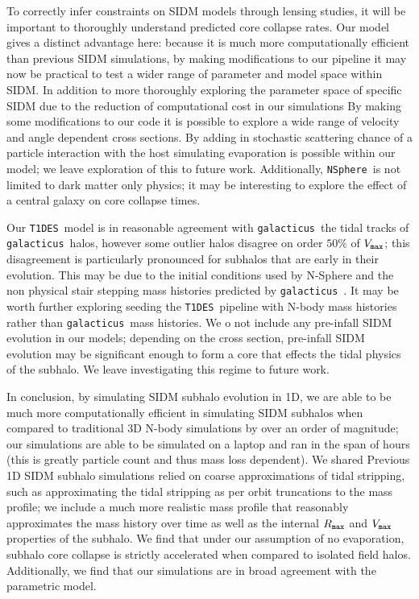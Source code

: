 \documentclass[%
 reprint,
 amsmath,
 amssymb,
 aps,
]{revtex4-2}
\def\gal{{\tt galacticus}~}
\def\tides{{\tt T1DES}~}
\def\nsphere{{\tt NSphere}~}
\begin{document}
To correctly infer constraints on SIDM models through lensing studies, it will be important to thoroughly understand predicted core collapse rates.
Our model gives a distinct advantage here: because it is much more computationally efficient than previous SIDM simulations, by making modifications to our pipeline it may now be practical to test a wider range of parameter and model space within SIDM. 
In addition to more thoroughly exploring the parameter space of specific SIDM due to the reduction of computational cost in our simulations 
By making some modifications to our code it is possible to explore a wide range of velocity and angle dependent cross sections.
By adding in stochastic scattering chance of a particle interaction with the host simulating evaporation is possible within our model; we leave exploration of this to future work. 
Additionally, \nsphere is not limited to dark matter only physics; it may be interesting to explore the effect of a central galaxy on core collapse times. 

Our \tides model is in reasonable agreement with \gal the tidal tracks of \gal halos, however some outlier halos disagree on order $50 \%$ of $V_{\tt max}$; this disagreement is particularly pronounced for subhalos that are early in their evolution. 
This may be due to the initial conditions used by N-Sphere and the non physical stair stepping mass histories predicted by \gal.
It may be worth further exploring seeding the \tides pipeline with N-body mass histories rather than \gal mass histories. 
We o not include any pre-infall SIDM evolution in our models; depending on the cross section, pre-infall SIDM evolution may be significant enough to form a core that effects the tidal physics of the subhalo.
We leave investigating this regime to future work. 

In conclusion, by simulating SIDM subhalo evolution in 1D, we are able to be much more computationally efficient in simulating SIDM subhalos when compared to traditional 3D N-body simulations by over an order of magnitude; our simulations are able to be simulated on a laptop and  ran in the span of hours (this is greatly particle count and thus mass loss dependent).
We shared 
Previous 1D SIDM subhalo simulations relied on coarse approximations of tidal stripping, such as approximating the tidal stripping as per orbit truncations to the mass profile; we include a much more realistic mass profile that reasonably approximates the mass history over time as well as the internal $R_{\tt max}$ and $V_{\tt max}$ properties of the subhalo. 
We find that under our assumption of no evaporation, subhalo core collapse is strictly accelerated when compared to isolated field halos. 
Additionally, we find that our simulations are in broad agreement with the \citet{yang2024parametric} parametric model. 
\end{document}
